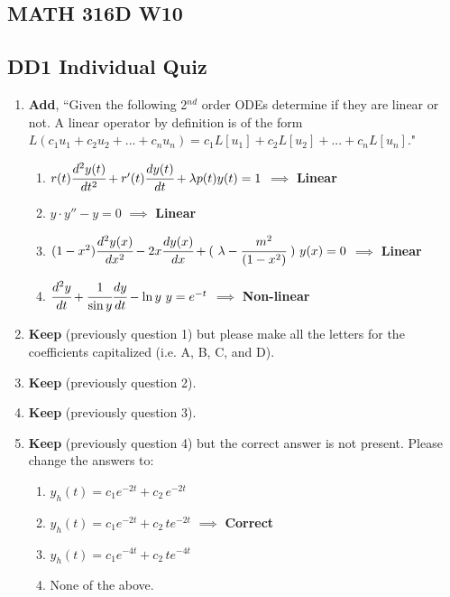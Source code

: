 \documentclass[fleqn]{article}[11pt]
\begin{document}
	
\begin{center}\section*{MATH 316D W10}\end{center}
\subsection*{DD1 Individual Quiz}

\begin{enumerate}
	\item \textbf{Add}, ``Given the following 2$^{nd}$ order ODEs determine if they are linear or not. A linear operator by definition is of the form \(L(c_{1}u_{1}+c_{2}u_{2}+...+c_{n}u_{n})=c_{1}L[u_{1}]+c_{2}L[u_{2}]+...+c_{n}L[u_{n}]\)."
	
	\begin{enumerate}
		\item $r(t)\cfrac{d^2y(t)}{dt^2}+r'(t)\cfrac{dy(t)}{dt}+\lambda p(t)y(t)=1$ $\implies$ \textbf{Linear}
		\item $y\cdot y''-y=0$ $\implies$ \textbf{Linear}
		\item $(1-x^2)\cfrac{d^2y(x)}{dx^2}-2x\cfrac{dy(x)}{dx}+(\ \lambda-\cfrac{m^2}{(1-x^2)}\ )\ y(x)=0$ $\implies$ \textbf{Linear}
		\item $\cfrac{d^2y}{dt}+\cfrac{1}{\sin{y}}\cfrac{dy}{dt}-\ln{y}\ y=e^{-t}$ $\implies$ \textbf{Non-linear}
	\end{enumerate}
	
	\item \textbf{Keep} (previously question 1) but please make all the letters for the coefficients capitalized (i.e. A, B, C, and D).

	\item \textbf{Keep} (previously question 2).
	
	\item \textbf{Keep} (previously question 3).
	
	\item \textbf{Keep} (previously question 4) but the correct answer is not present. Please change the answers to:
		\begin{enumerate}
			\item $y_{h}(t)=c_1 e^{-2t}+c_2\, e^{-2t}$
			\item $y_{h}(t)=c_1 e^{-2t}+c_2\, te^{-2t}$ $\implies$ \textbf{Correct}
			\item $y_{h}(t)=c_1 e^{-4t}+c_2\, te^{-4t}$
			\item None of the above.
		\end{enumerate}
		

\end{enumerate}
\end{document}

